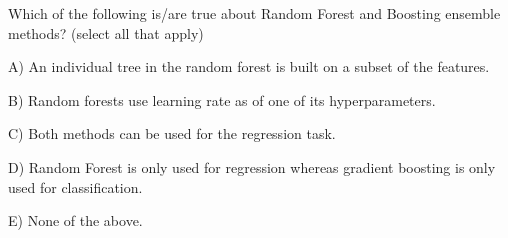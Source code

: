 Which of the following is/are true about Random Forest and Boosting ensemble methods? (select all that apply)


A) An individual tree in the random forest is built on a subset of the features.


B) Random forests use learning rate as of one of its hyperparameters.


C) Both methods can be used for the regression task.


D) Random Forest is only used for regression whereas gradient boosting is only used for classification.


E) None of the above.
